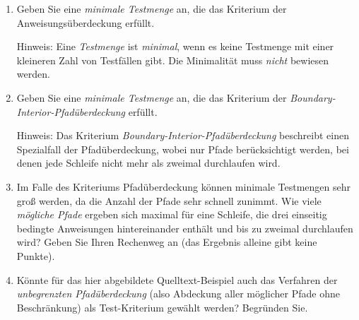 \documentclass{lehramt-informatik-aufgabe}
\begin{document}
\begin{enumerate}
\begin{liAntwort}
\end{liAntwort}

\item Geben Sie eine \emph{minimale Testmenge} an, die das Kriterium der
Anweisungsüberdeckung erfüllt.

Hinweis: Eine \emph{Testmenge} ist \emph{minimal}, wenn es keine
Testmenge mit einer kleineren Zahl von Testfällen gibt. Die Minimalität
muss \emph{nicht} bewiesen werden.

\item Geben Sie eine \emph{minimale Testmenge} an, die das Kriterium der
\emph{Boundary-Interior-Pfadüberdeckung} erfüllt.

Hinweis: Das Kriterium \emph{Boundary-Interior-Pfadüberdeckung}
beschreibt einen Spezialfall der Pfadüberdeckung, wobei nur Pfade
berücksichtigt werden, bei denen jede Schleife nicht mehr als zweimal
durchlaufen wird.

\item Im Falle des Kriteriums Pfadüberdeckung können minimale Testmengen
sehr groß werden, da die Anzahl der Pfade sehr schnell zunimmt. Wie
viele \emph{mögliche Pfade} ergeben sich maximal für eine Schleife, die
drei einseitig bedingte Anweisungen hintereinander enthält und bis zu
zweimal durchlaufen wird? Geben Sie Ihren Rechenweg an (das Ergebnis
alleine gibt keine Punkte).

\item Könnte für das hier abgebildete Quelltext-Beispiel auch das
Verfahren der \emph{unbegrenzten Pfadüberdeckung} (also Abdeckung aller
möglicher Pfade ohne Beschränkung) als Test-Kriterium gewählt werden?
Begründen Sie.

\end{enumerate}
\end{document}
